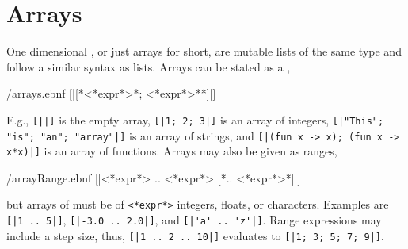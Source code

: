 \documentclass[fsharpNotes.tex]{subfiles}
\begin{document}

\section{Arrays}
\label{sec:arrays}
One dimensional , or just arrays for short, are mutable lists of the same type and follow a similar syntax as lists. Arrays can be stated as a ,
%
\begin{verbatimwrite}{\ebnf/arrays.ebnf}
[|[*<*expr*>{*; <*expr*>*}*]|]
\end{verbatimwrite}
%
E.g., \lstinline![||]! is the empty array, \mbox{\lstinline![|1; 2; 3|]!} is an array of integers, \mbox{\lstinline![|"This"; "is"; "an"; "array"|]!} is an array of strings, and \mbox{\lstinline![|(fun x -> x); (fun x -> x*x)|]!} is an array of functions.  Arrays may also be given as ranges,
%
\begin{verbatimwrite}{\ebnf/arrayRange.ebnf}
[|<*expr*> .. <*expr*> [*.. <*expr*>*]|]
\end{verbatimwrite}
%
but arrays of  must be of \lstinline[language=syntax]{<*expr*>} integers, floats, or characters. Examples are \mbox{\lstinline![|1 .. 5|]!}, \mbox{\lstinline![|-3.0 .. 2.0|]!}, and \mbox{\lstinline![|'a' .. 'z'|]!}. Range expressions may include a step size, thus, \mbox{\lstinline![|1 .. 2 .. 10|]!} evaluates to \mbox{\lstinline![|1; 3; 5; 7; 9|]!}.
\end{document}
